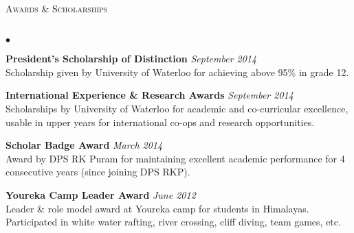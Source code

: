 \documentclass{article}
\newcommand{\lineunder}{\vspace*{-8pt} \\ \hspace*{-18pt} \hrulefill \\}
\newcommand{\header}[1]{{\hspace*{-15pt}\vspace*{6pt} \textsc{#1}} \vspace*{-6pt} \lineunder}
\newenvironment{achievements}{\begin{list}{$\bullet$}{\topsep 0pt \itemsep -1.5pt \leftmargin 5pt}}{\vspace*{4pt}\end{list}}
\begin{document}
\vspace{7pt}

\header{\normalsize Awards \& Scholarships}
\begin{achievements}
\item \textbf{President's Scholarship of Distinction} \hfill \textit {September 2014}
\\ Scholarship given by University of Waterloo for achieving above 95\% in grade 12.
\item \textbf{International Experience \& Research Awards} \hfill \textit {September 2014}
\\ Scholarships by University of Waterloo for academic and co-curricular excellence, usable in upper years for international co-ops and research opportunities.
\item \textbf{Scholar Badge Award} \hfill \textit {March 2014}
\\ Award by DPS RK Puram for maintaining excellent academic performance for 4 consecutive years (since joining DPS RKP).
\item \textbf{Youreka Camp Leader Award} \hfill \textit {June 2012}
\\ Leader \& role model award at Youreka camp for students in Himalayas. Participated in white water rafting, river crossing, cliff diving, team games, etc. \\ \hspace*{-18pt} \hrulefill \\
\end{achievements}
\end{document}
